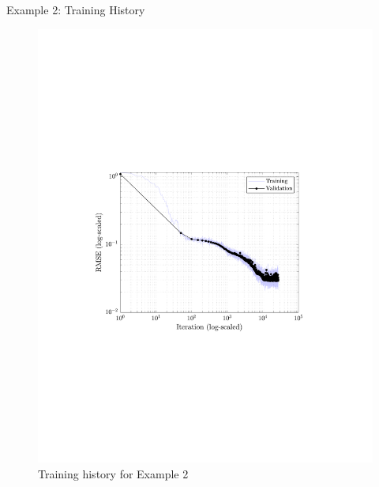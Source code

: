 \documentclass[9pt]{beamer}
\newcounter{frame}[frame]
\begin{document}
\begin{frame}{Example 2: Training History}
\begin{figure}
	\includegraphics[height=.8\textheight]{neuralNetHysteresis02RMSE}
	\caption{Training history for Example 2}
\end{figure}
\end{frame}
\end{document}
